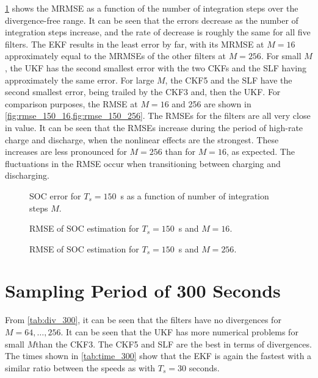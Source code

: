 \documentclass[../zhang_thesis.tex]{subfiles}
\begin{document}
\cref{fig:mrmse_150} shows the MRMSE as a function of the number of integration steps over the divergence-free range. It can be seen that the errors decrease as the number of integration steps increase, and the rate of decrease is roughly the same for all five filters. The EKF results in the least error by far, with its MRMSE at $M=16$ approximately equal to the MRMSEs of the other filters at $M=256$. For small $M$, the UKF has the second smallest error with the two CKFs and the SLF having approximately the same error. For large $M$, the CKF5 and the SLF have the second smallest error, being trailed by the CKF3 and, then the UKF. For comparison purposes, the RMSE at $M=16$ and 256 are shown in \cref{fig:rmse_150_16,fig:rmse_150_256}. The RMSEs for the filters are all very close in value. It can be seen that the RMSEs increase during the period of high-rate charge and discharge, when the nonlinear effects are the strongest. These increases are less pronounced for $M=256$ than for $M=16$, as expected. The fluctuations in the RMSE occur when transitioning between charging and discharging.

\begin{figure}[b]
\centering

\caption{SOC error for $T_s=150$~s as a function of number of integration steps $M$.}
\label{fig:mrmse_150}
\end{figure}

\begin{figure}
\centering

\caption{RMSE of SOC estimation for $T_s=150$~s and $M=16$.}
\label{fig:rmse_150_16}
\end{figure}

\begin{figure}
\centering

\caption{RMSE of SOC estimation for $T_s=150$~s and $M=256$.}
\label{fig:rmse_150_256}
\end{figure}

\clearpage

\section{Sampling Period of 300 Seconds}

From \cref{tab:div_300}, it can be seen that the filters have no divergences for $M=64,\dots,256$. It can be seen that the UKF has more numerical problems for small $M$than the CKF3. The CKF5 and SLF are the best in terms of divergences. The times shown in \cref{tab:time_300} show that the EKF is again the fastest with a similar ratio between the speeds as with $T_s=30$ seconds. 
\end{document}
